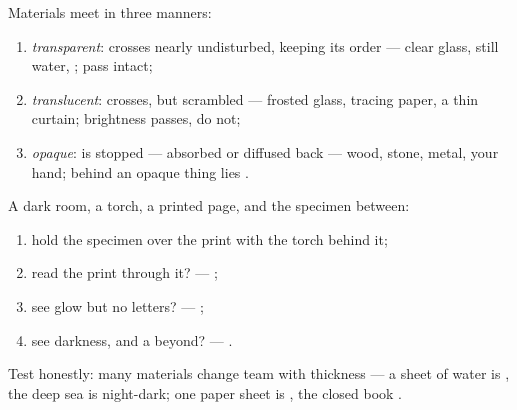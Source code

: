 \begin{definition}\label{def:g7:light-sources-propagation:coats}
Materials meet  in three manners:
\begin{enumerate}
  \item \emph{transparent}:  crosses
        nearly undisturbed, keeping its order --- clear glass,
        still water, ;  pass intact;
  \item \emph{translucent}:  crosses,
        but scrambled --- frosted glass, tracing paper, a thin
        curtain; brightness passes,  do not;
  \item \emph{opaque}:  is stopped ---
        absorbed or diffused back --- wood, stone, metal, your
        hand; behind an opaque thing lies .
\end{enumerate}
\end{definition}

\begin{method}\label{met:g7:light-sources-propagation:sort}
A dark room, a torch, a printed page, and the specimen between:
\begin{enumerate}
  \item hold the specimen over the print with the torch behind
        it;
  \item read the print through it? --- ;
  \item see glow but no letters? --- ;
  \item see darkness, and a  beyond? --- .
\end{enumerate}
Test honestly: many materials change team with thickness --- a
sheet of water is , the deep sea is night-dark; one
paper sheet is , the closed book .
\end{method}

